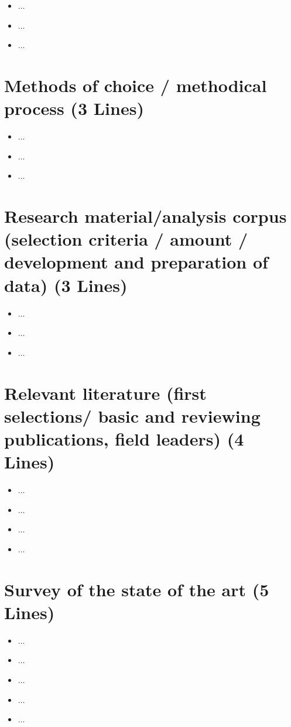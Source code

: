 \documentclass[12pt]{scrartcl}
\begin{document}
\begin{itemize}
    \item ...
    \item ...
    \item ...
 
\end{itemize}

\section*{Methods of choice / methodical process (3 Lines)}

\begin{itemize}
    \item ...
    \item ...
    \item ...
 
\end{itemize}


\section*{Research material/analysis corpus (selection criteria / amount / development and preparation of data) (3 Lines)}

\begin{itemize}
    \item ...
    \item ...
    \item ...
 
\end{itemize}


\section*{Relevant literature (first selections/ basic and reviewing publications, field leaders) (4 Lines) }
\begin{itemize}
    \item ...
    \item ...
    \item ...
    \item ...
 
\end{itemize}


\section*{Survey of the state of the art (5 Lines)}
\begin{itemize}
    \item ...
    \item ...
    \item ...
    \item ...
    \item ...
 
\end{itemize}
\end{document}
